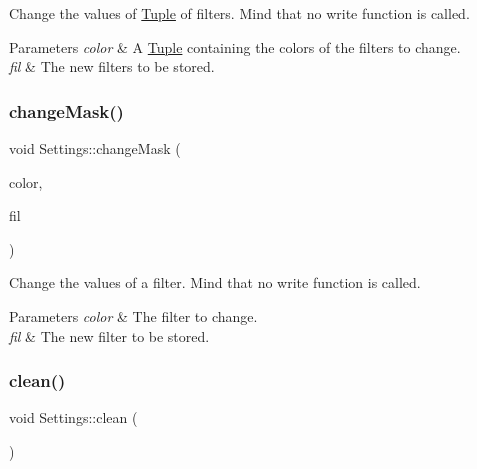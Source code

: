 Change the values of \mbox{\hyperlink{class_tuple}{Tuple}} of filters. Mind that no write function is called. 


\begin{DoxyParams}{Parameters}
{\em color} & A \mbox{\hyperlink{class_tuple}{Tuple}} containing the colors of the filters to change. \\
\hline
{\em fil} & The new filters to be stored. \\
\hline
\end{DoxyParams}
\mbox{\label{class_settings_ad00eb6c82b7e6af5afbb8d881c50dea8}} 
\subsubsection{\texorpdfstring{changeMask()}{changeMask()}\hspace{0.1cm}{\footnotesize\ttfamily [2/2]}}
{\footnotesize\ttfamily void Settings\+::change\+Mask (\begin{DoxyParamCaption}\item[{\mbox{\hyperlink{class_settings_a30d85f2e06a54ae9bc8da2d01037658f}{C\+O\+L\+OR}}}]{color,  }\item[{\mbox{\hyperlink{class_filter}{Filter}}}]{fil }\end{DoxyParamCaption})}



Change the values of a filter. Mind that no write function is called. 


\begin{DoxyParams}{Parameters}
{\em color} & The filter to change. \\
\hline
{\em fil} & The new filter to be stored. \\
\hline
\end{DoxyParams}
\mbox{\label{class_settings_a8ad60105ab9848720d05ebd19c5063f2}} 
\subsubsection{\texorpdfstring{clean()}{clean()}}
{\footnotesize\ttfamily void Settings\+::clean (\begin{DoxyParamCaption}{ }\end{DoxyParamCaption})}



